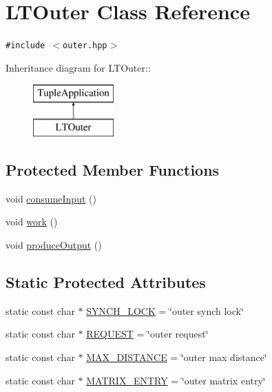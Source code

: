 \hypertarget{class_l_t_outer}{
\section{LTOuter Class Reference}
\label{class_l_t_outer}
}
{\tt \#include $<$outer.hpp$>$}

Inheritance diagram for LTOuter::\begin{figure}[H]
\begin{center}
\leavevmode
\includegraphics[height=2cm]{class_l_t_outer}
\end{center}
\end{figure}
\subsection*{Protected Member Functions}
\begin{CompactItemize}
\item 
void \hyperlink{class_l_t_outer_3e0493a0d06fbc86fe614edbd752eb8a}{consumeInput} ()
\item 
void \hyperlink{class_l_t_outer_e0b1322b40271bb94c272b6117c8d16c}{work} ()
\item 
void \hyperlink{class_l_t_outer_2a12a006761b2e1132b84209d29fddac}{produceOutput} ()
\end{CompactItemize}
\subsection*{Static Protected Attributes}
\begin{CompactItemize}
\item 
static const char $\ast$ \hyperlink{class_l_t_outer_39056ff036f5138e2f7529c804698bb4}{SYNCH\_\-LOCK} = \char`\"{}outer synch lock\char`\"{}
\item 
static const char $\ast$ \hyperlink{class_l_t_outer_6941f4f6ba366cff85accf2adc955a66}{REQUEST} = \char`\"{}outer request\char`\"{}
\item 
static const char $\ast$ \hyperlink{class_l_t_outer_3a27e2c7371866691ebe47def5db76fa}{MAX\_\-DISTANCE} = \char`\"{}outer max distance\char`\"{}
\item 
static const char $\ast$ \hyperlink{class_l_t_outer_b1e7e3c0471f26305f697f1324f769fa}{MATRIX\_\-ENTRY} = \char`\"{}outer matrix entry\char`\"{}
\end{CompactItemize}


